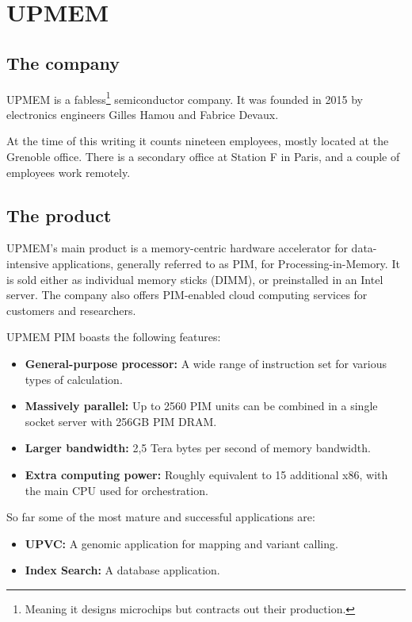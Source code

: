 \chapter{UPMEM}

\section{The company}

UPMEM is a fabless\footnote{Meaning it designs microchips but contracts out their production.} semiconductor company. It was founded in 2015 by electronics engineers Gilles Hamou and Fabrice Devaux.

At the time of this writing it counts nineteen employees, mostly located at the Grenoble office. There is a secondary office at Station F in Paris, and a couple of employees work remotely.

\section{The product}
UPMEM's main product is a memory-centric hardware accelerator for data-intensive applications, generally referred to as PIM, for Processing-in-Memory. It is sold either as individual memory sticks (DIMM), or preinstalled in an Intel server. The company also offers PIM-enabled cloud computing services for customers and researchers.

UPMEM PIM boasts the following features:

\begin{itemize}
    \item \textbf{General-purpose processor:} A wide range of instruction set for various types of calculation.
    \item \textbf{Massively parallel:} Up to 2560 PIM units can be combined in a single socket server with 256GB PIM DRAM.
    \item \textbf{Larger bandwidth:} 2,5 Tera bytes per second of memory bandwidth.
    \item \textbf{Extra computing power:} Roughly equivalent to 15 additional x86, with the main CPU used for orchestration.
\end{itemize}

So far some of the most mature and successful applications are:

\begin{itemize}
    \item \textbf{UPVC:} A genomic application for mapping and variant calling.
    \item \textbf{Index Search:} A database application.
\end{itemize}

